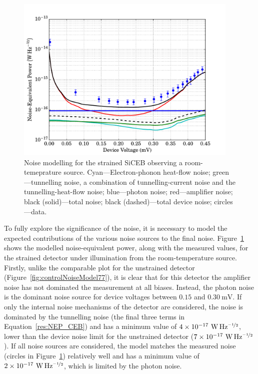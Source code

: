 \begin{figure}[tb]
\begin{center}
\includegraphics[width = 0.95\textwidth]{figures/strained_noiseModel300}
\caption[Noise modelling for the strained SiCEB observing a room-temperature source]{Noise modelling for the strained SiCEB observing a room-temeprature source. Cyan---Electron-phonon heat-flow noise; green---tunnelling noise, a combination of tunnelling-current noise and the tunnelling-heat-flow noise; blue---photon noise; red---amplifier noise; black (solid)---total noise; black (dashed)---total device noise; circles---data.}
\label{fig:strainedNoiseModel300}
\end{center}
\end{figure}
\par
To fully explore the significance of the noise, it is necessary to model the expected contributions of the various noise sources to the final noise. Figure~\ref{fig:strainedNoiseModel300} shows the modelled noise-equivalent power, along with the measured values, for the strained detector under illumination from the room-temperature source. Firstly, unlike the comparable plot for the unstrained detector (Figure~\ref{fig:controlNoiseModel77}), it is clear that for this detector the amplifier noise has not dominated the measurement at all biases. Instead, the photon noise is the dominant noise source for device voltages between $0.15$ and $0.30~\mathrm{mV}$. If only the internal noise mechanisms of the detector are considered, the noise is dominated by the tunnelling noise (the final three terms in Equation~\ref{res:NEP_CEB}) and has a minimum value of $4\times 10^{-17}~\mathrm{W\,Hz^{\nicefrac{-1}{2}}}$, lower than the device noise limit for the unstrained detector ($7\times 10^{-17}~\mathrm{W\,Hz^{\nicefrac{-1}{2}}}$). If all noise sources are considered, the model matches the measured noise (circles in Figure~\ref{fig:strainedNoiseModel300}) relatively well and has a minimum value of $2\times 10^{-17}~\mathrm{W\,Hz^{\nicefrac{-1}{2}}}$, which is limited by the photon noise.
